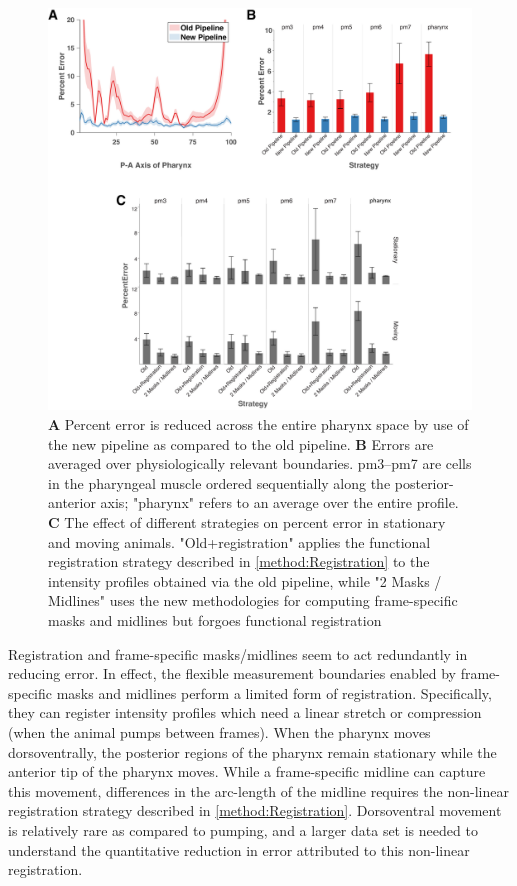 \begin{figure}[ht]
    \centering
    \includegraphics[scale=0.3]{Figures/rendered_files/errors_by_strategy}
    \decoRule
    \caption[Error by strategy in the synthetic data set]{\textbf{A} Percent error is reduced across the entire pharynx space by use of the new pipeline as compared to the old pipeline. \textbf{B} Errors are averaged over physiologically relevant boundaries. pm3--pm7 are cells in the pharyngeal muscle ordered sequentially along the posterior-anterior axis; "pharynx" refers to an average over the entire profile. \textbf{C} The effect of different strategies on percent error in stationary and moving animals. "Old+registration" applies the functional registration strategy described in \ref{method:Registration} to the intensity profiles obtained via the old pipeline, while "2 Masks / Midlines" uses the new methodologies for computing frame-specific masks and midlines but forgoes functional registration}
    \label{fig:PercentErrorByStrategy}
\end{figure}

Registration and frame-specific masks/midlines seem to act redundantly in reducing error. In effect, the flexible measurement boundaries enabled by frame-specific masks and midlines perform a limited form of registration. Specifically, they can register intensity profiles which need a linear stretch or compression (when the animal pumps between frames). When the pharynx moves dorsoventrally, the posterior regions of the pharynx remain stationary while the anterior tip of the pharynx moves. While a frame-specific midline can capture this movement, differences in the arc-length of the midline requires the non-linear registration strategy described in \ref{method:Registration}. Dorsoventral movement is relatively rare as compared to pumping, and a larger data set is needed to understand the quantitative reduction in error attributed to this non-linear registration.